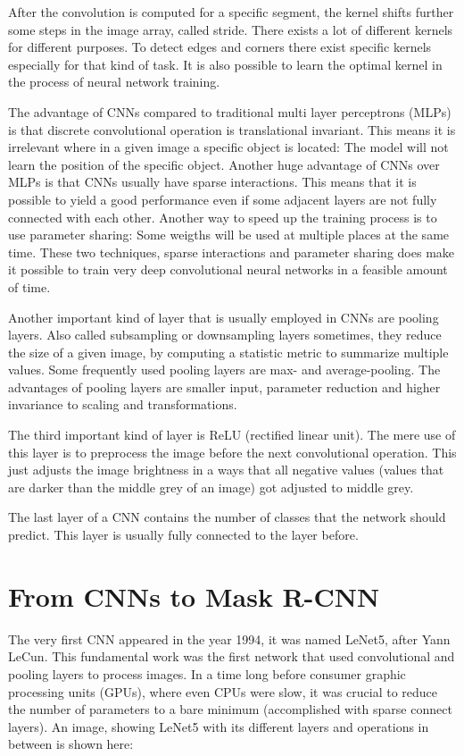 After the convolution is computed for a specific segment, the kernel shifts further some steps in the image array, called stride. There exists a lot of different kernels for different purposes. To detect edges and corners there exist specific kernels especially for that kind of task. It is also possible to learn the optimal kernel in the process of neural network training.

The advantage of CNNs compared to traditional multi layer perceptrons (MLPs) is that discrete convolutional operation is translational invariant. This means it is irrelevant where in a given image a specific object is located: The model will not learn the position of the specific object. Another huge advantage of CNNs over MLPs is that CNNs usually have sparse interactions. This means that it is possible to yield a good performance even if some adjacent layers are not fully connected with each other. Another way to speed up the training process is to use parameter sharing: Some weigths will be used at multiple places at the same time. These two techniques, sparse interactions and parameter sharing does make it possible to train very deep convolutional neural networks in a feasible amount of time.

Another important kind of layer that is usually employed in CNNs are pooling layers. Also called subsampling or downsampling layers sometimes, they reduce the size of a given image, by computing a statistic metric to summarize multiple values. Some frequently used pooling layers are max- and average-pooling. The advantages of pooling layers are smaller input, parameter reduction and higher invariance to scaling and transformations.

The third important kind of layer is ReLU (rectified linear unit). The mere use of this layer is to preprocess the image before the next convolutional operation. This just adjusts the image brightness in a ways that all negative values (values that are darker than the middle grey of an image) got adjusted to middle grey.

The last layer of a CNN contains the number of classes that the network should predict. This layer is usually fully connected to the layer before.

\section{From CNNs to Mask R-CNN}

The very first CNN appeared in the year 1994, it was named LeNet5, after Yann LeCun. This fundamental work was the first network that used convolutional and pooling layers to process images. In a time long before consumer graphic processing units (GPUs), where even CPUs were slow, it was crucial to reduce the number of parameters to a bare minimum (accomplished with sparse connect layers). An image, showing LeNet5 with its different layers and operations in between is shown here:

